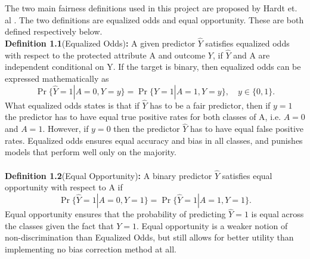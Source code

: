 \documentclass[11pt, fleqn, titlepage]{article}
\begin{document}
	The two main fairness definitions used in this project are proposed by Hardt et. al \cite{equal_of_oppor}. The two definitions are equalized odds and equal opportunity. These are both defined respectively below.  \\ \newline \textbf{Definition 1.1}(Equalized Odds)\textbf{:} A given predictor $ \hat Y $ satisfies equalized odds with respect to the protected attribute A and outcome $ Y $, if $ \hat Y $ and A are independent conditional on Y. If the target is binary, then equalized odds can be expressed mathematically as
	\begin{equation*}\label{key}
	\operatorname{Pr}\{\widehat{Y}=1 | A=0, Y=y\}=\operatorname{Pr}\{\hat{Y}=1 | A=1, Y=y\}, \quad y \in\{0,1\}.
	\end{equation*}
	What equalized odds states is that if $ \hat Y $ has to be a fair predictor, then if $ y = 1 $ the predictor has to have equal true positive rates for both classes of A, i.e. $ A = 0 $  and $ A = 1 $. However, if $ y = 0 $ then the predictor $ \hat Y $ has to have equal false positive rates. Equalized odds ensures equal accuracy and bias in all classes, and punishes models that perform well only on the majority.
	\\\\
	\textbf{Definition 1.2}(Equal Opportunity)\textbf{:} A binary predictor $ \hat Y $ satisfies equal opportunity with respect to A if 
	\begin{equation*}
		\operatorname{Pr}\{\hat{Y}=1 | A=0, Y=1\}=\operatorname{Pr}\{\hat{Y}=1 | A=1, Y=1\}.
	\end{equation*}
	Equal opportunity ensures that the probability of predicting $ \hat Y = 1 $ is equal across the classes given the fact that $ Y = 1 $. Equal opportunity is a weaker notion of non-discrimination than Equalized Odds, but still allows for better utility than implementing no bias correction method at all.
	
	
\end{document}
